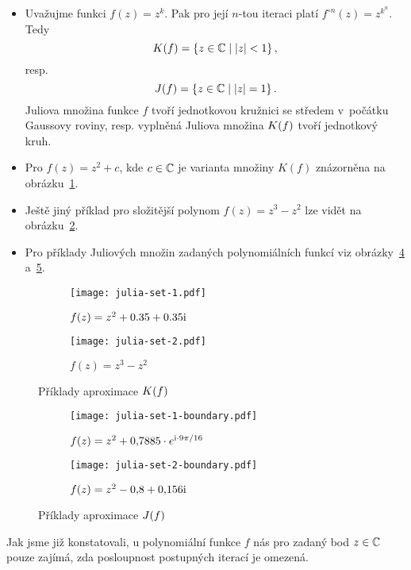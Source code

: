 \begin{example}
    \begin{itemize}
        \item Uvažujme funkci $f(z)=z^k$. Pak pro její $n$-tou iteraci platí $f^{\circ n}(z)=z^{k^n}$. Tedy
        \[K(f)=\left\{z\in\mathbb{C}\mid |z|<1\right\},\]
        resp.
        \[J(f)=\left\{z\in\mathbb{C}\mid|z|=1\right\}.\]
        Juliova množina funkce $f$ tvoří jednotkovou kružnici se středem v~počátku Gaussovy roviny, resp. vyplněná Juliova množina $K(f)$ tvoří jednotkový kruh.
        \item Pro $f(z)=z^2+c$, kde $c\in\mathbb{C}$ je varianta množiny $K(f)$ znázorněna na obrázku~\ref{subfig:vyplnena-juliova-mnozina-1}.
        \item Ještě jiný příklad pro složitější polynom $f(z)=z^3-z^2$ lze vidět na obrázku~\ref{subfig:vyplnena-juliova-mnozina-2}.
        \item Pro příklady Juliových množin zadaných polynomiálních funkcí viz obrázky~\ref{subfig:juliova-mnozina-1} a~\ref{subfig:juliova-mnozina-2}.
    \end{itemize}
\end{example}
\begin{figure}[h]
    \centering
    \begin{subfigure}{0.45\textwidth}
        \centering
        \texttt{[image: julia-set-1.pdf]}
        \caption{$f(z)=z^2+0.35 + 0.35\textrm{i}$}
        \label{subfig:vyplnena-juliova-mnozina-1}
    \end{subfigure}
    \qquad
    \begin{subfigure}{0.45\textwidth}
        \centering
        \texttt{[image: julia-set-2.pdf]}
        \caption{$f(z)=z^3-z^2$}
        \label{subfig:vyplnena-juliova-mnozina-2}
    \end{subfigure}
    \caption{Příklady aproximace $K(f)$}
    \label{fig:priklady-vyplnenych-juliovych-mnozin}
\end{figure}
\begin{figure}[h]
    \centering
    \begin{subfigure}{0.45\textwidth}
        \centering
        \texttt{[image: julia-set-1-boundary.pdf]}
        \caption{$f(z)=z^2 + 0{,}7885\cdot e^{\textrm{i}\cdot9\pi/16}$}
        \label{subfig:juliova-mnozina-1}
    \end{subfigure}
    \qquad
    \begin{subfigure}{0.45\textwidth}
        \centering
        \texttt{[image: julia-set-2-boundary.pdf]}
        \caption{$f(z)=z^2 - 0{,}8 + 0{,}156\textrm{i}$}
        \label{subfig:juliova-mnozina-2}
    \end{subfigure}
    \caption{Příklady aproximace $J(f)$}
    \label{fig:priklady-juliovych-mnozin}
\end{figure}
Jak jsme již konstatovali, u polynomiální funkce $f$ nás pro zadaný bod $z\in\mathbb{C}$ pouze zajímá, zda posloupnost postupných iterací je omezená.

